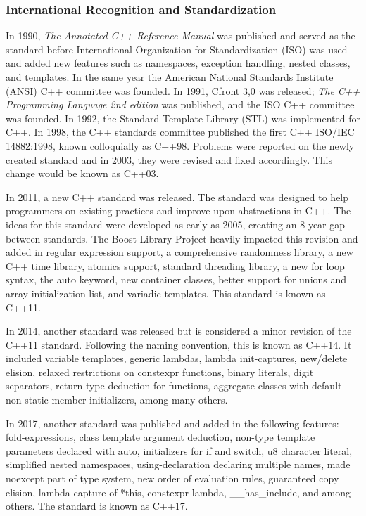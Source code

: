 \documentclass[12pt]{article}
\begin{document}
\subsubsection{International Recognition and Standardization}
In 1990, \textit{The Annotated C++ Reference Manual} was published and served as the standard before International Organization for Standardization (ISO) was used and added new features such as namespaces, exception handling, nested classes, and templates. In the same year the American National Standards Institute (ANSI) C++ committee was founded. In 1991, Cfront 3,0 was released; \textit{The C++ Programming Language 2nd edition} was published, and the ISO C++ committee was founded. In 1992, the Standard Template Library (STL) was implemented for C++. In 1998, the C++ standards committee published the first C++ ISO/IEC 14882:1998, known colloquially as C++98. Problems were reported on the newly created standard and in 2003, they were revised and fixed accordingly. This change would be known as C++03.

In 2011, a new C++ standard was released. The standard was designed to help programmers on existing practices and improve upon abstractions in C++. The ideas for this standard were developed as early as 2005, creating an 8-year gap between standards. The Boost Library Project heavily impacted this revision and added in regular expression support, a comprehensive randomness library, a new C++ time library, atomics support, standard threading library, a new for loop syntax, the auto keyword, new container classes, better support for unions and array-initialization list, and variadic templates. This standard is known as C++11.

In 2014, another standard was released but is considered a minor revision of the C++11 standard. Following the naming convention, this is known as C++14. It included variable templates, generic lambdas, lambda init-captures, new/delete elision, relaxed restrictions on constexpr functions, binary literals, digit separators, return type deduction for functions, aggregate classes with default non-static member initializers, among many others.

In 2017, another standard was published and added in the following features: fold-expressions, class template argument deduction, non-type template parameters declared with auto, initializers for if and switch, u8 character literal, simplified nested namespaces, using-declaration declaring multiple names, made noexcept part of type system, new order of evaluation rules, guaranteed copy elision, lambda capture of *this, constexpr lambda, \_\_has\_include, and among others. The standard is known as C++17.
\end{document}
